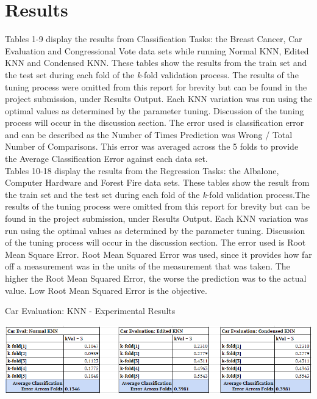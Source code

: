 \documentclass[twoside,11pt]{article}
\begin{document}
\newpage

\section{Results}
Tables 1-9 display the results from Classification Tasks: the Breast Cancer, Car Evaluation and Congressional Vote data sets while running Normal KNN, Edited KNN and Condensed KNN. These tables show the results from the train set and the test set during each fold of the \textit{k}-fold validation process. The results of the tuning process were omitted from this report for brevity but can be found in the project submission, under Results Output. Each KNN variation was run using the optimal values as determined by the parameter tuning. Discussion of the tuning process will occur in the discussion section. The error used is classification error and can be described as the Number of Times Prediction was Wrong / Total Number of Comparisons. This error was averaged across the 5 folds to provide the Average Classification Error against each data set.\\
Tables 10-18 display the results from the Regression Tasks: the Albalone, Computer Hardware and Forest Fire data sets. These tables show the result from the train set and the test set during each fold of the \textit{k}-fold validation process.The results of the tuning process were omitted from this report for brevity but can be found in the project submission, under Results Output. Each KNN variation was run using the optimal values as determined by the parameter tuning. Discussion of the tuning process will occur in the discussion section. The error used is Root Mean Square Error. Root Mean Squared Error was used, since it provides how far off a measurement was in the units of the measurement that was taken. The higher the Root Mean Squared Error, the worse the prediction was to the actual value. Low Root Mean Squared Error is the objective.\newline

\begin{table}[h]
		\centering
		\caption{Car Evaluation: KNN - Experimental Results}
		\label{tab:table1}
		\includegraphics[scale=.7]{CV_ALL_Results}\newline
\end{table}
\end{document}
